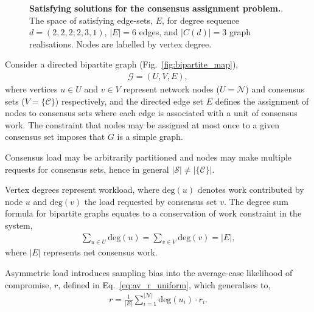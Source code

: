 \documentclass[twocolumn, aps, amsmath, amssymb, nofootinbib, superscriptaddress, longbibliography, floatfix, eqsecnum, rmp]{revtex4-2}
\begin{document}
\begin{figure}[!htb]
	\centering
	
	\caption{\textbf{Satisfying solutions for the consensus assignment problem.}. The space of satisfying edge-sets, $E$, for degree sequence \mbox{$d=(2,2,2;2,3,1)$}, \mbox{$|E|=6$} edges, and \mbox{$|C(d)|=3$} graph realisations. Nodes are labelled by vertex degree.}\label{fig:edge_assignments}
\end{figure}

Consider a directed bipartite graph (Fig.~\ref{fig:bipartite_map}),
\begin{align}
	\mathcal{G} = (U,V,E),
\end{align}
where vertices $u\in U$ and $v\in V$ represent network nodes (\mbox{$U=\mathcal{N}$}) and consensus sets (\mbox{$V=\mathcal{\{\mathcal{C}\}}$}) respectively, and the directed edge set $E$ defines the assignment of nodes to consensus sets where each edge is associated with a unit of consensus work. The constraint that nodes may be assigned at most once to a given consensus set imposes that $G$ is a simple graph.

Consensus load may be arbitrarily partitioned and nodes may make multiple requests for consensus sets, hence in general $|\mathcal{S}|\neq|\{\mathcal{C}\}|$. %

Vertex degrees represent workload, where $\mathrm{deg}(u)$ denotes work contributed by node $u$ and $\mathrm{deg}(v)$ the load requested by consensus set $v$. The degree sum formula for bipartite graphs equates to a conservation of work constraint in the system,
\begin{align} \label{eq:degree_sum}
	\sum_{u\in U} \mathrm{deg}(u) = \sum_{v\in V} \mathrm{deg}(v) = |E|,
\end{align}
where $|E|$ represents net consensus work.

Asymmetric load introduces sampling bias into the average-case likelihood of compromise, $r$, defined in Eq.~\eqref{eq:av_r_uniform}, which generalises to,
\begin{align}
	r = \frac{1}{|E|} \sum_{i=1}^{|\mathcal{N}|} \mathrm{deg}(u_i) \cdot r_i.
\end{align}
\end{document}
